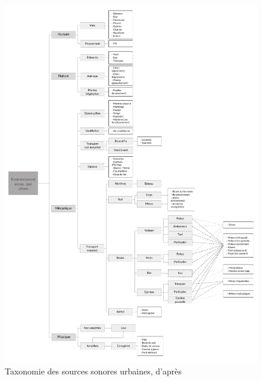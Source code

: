 \begin{figure}[t]
        \myfloatalign
        \includegraphics[width=\linewidth]{gfx/categoSalamon}
        \caption{Taxonomie des sources sonores urbaines, d'après \citep{Salamon14}}\label{fig:catSoundscapeSalamon}
\end{figure}





